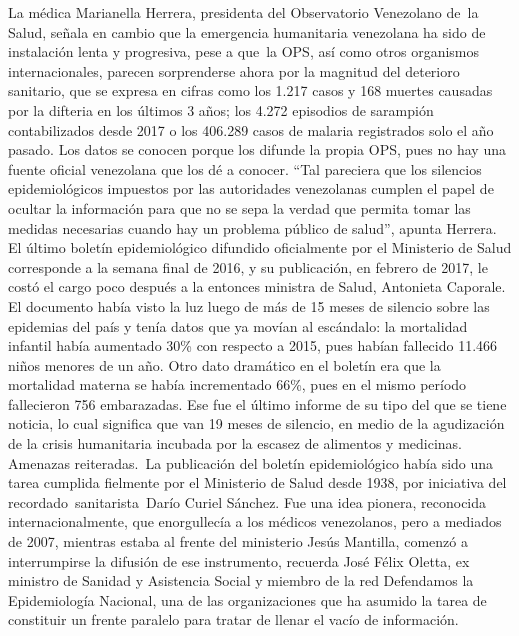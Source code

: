 \documentclass{article}%
\begin{document}
\newline%
%
La médica Marianella Herrera, presidenta del Observatorio Venezolano de~la Salud, señala en cambio que la emergencia humanitaria venezolana ha sido de instalación lenta y progresiva, pese a que~la OPS, así como otros organismos internacionales, parecen sorprenderse ahora por la magnitud del deterioro sanitario, que se expresa en cifras como los 1.217 casos y 168 muertes causadas por la difteria en los últimos 3 años; los 4.272 episodios de sarampión contabilizados desde 2017 o los 406.289 casos de malaria registrados solo el año pasado.%
\newline%
%
Los datos se conocen porque los difunde la propia OPS, pues no hay una fuente oficial venezolana que los dé a conocer. “Tal pareciera que los silencios epidemiológicos impuestos por las autoridades venezolanas cumplen el papel de ocultar la información para que no se sepa la verdad que permita tomar las medidas necesarias cuando hay un problema público de salud”, apunta Herrera.%
\newline%
%
El último boletín epidemiológico difundido oficialmente por el Ministerio de Salud corresponde a la semana final de 2016, y su publicación, en febrero de 2017, le costó el cargo poco después a la entonces ministra de Salud, Antonieta Caporale. El documento había visto la luz luego de más de 15 meses de silencio sobre las epidemias del país y tenía datos que ya movían al escándalo: la mortalidad infantil había aumentado 30\% con respecto a 2015, pues habían fallecido 11.466 niños menores de un año. Otro dato dramático en el boletín era que la mortalidad materna se había incrementado 66\%, pues en el mismo período fallecieron 756 embarazadas. Ese fue el último informe de su tipo del que se tiene noticia, lo cual significa que van 19 meses de silencio, en medio de la agudización de la crisis humanitaria incubada por la escasez de alimentos y medicinas.%
\newline%
%
Amenazas reiteradas.~La publicación del boletín epidemiológico había sido una tarea cumplida fielmente por el Ministerio de Salud desde 1938, por iniciativa del recordado~sanitarista~Darío Curiel Sánchez. Fue una idea pionera, reconocida internacionalmente, que enorgullecía a los médicos venezolanos, pero a mediados de 2007, mientras estaba al frente del ministerio Jesús Mantilla, comenzó a interrumpirse la difusión de ese instrumento, recuerda José Félix Oletta, ex ministro de Sanidad y Asistencia Social y miembro de la red Defendamos la Epidemiología Nacional, una de las organizaciones que ha asumido la tarea de constituir un frente paralelo para tratar de llenar el vacío de información.%
\end{document}
